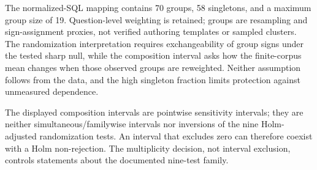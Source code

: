\documentclass[applsci,article,submit,moreauthors]{Definitions/mdpi}
\begin{document}
\begin{table}[htbp]
\caption{Complete primary factorial family for strict execution equality. Estimates are question-weighted finite-set differences; intervals are 95\% normalized-SQL-group composition-sensitivity intervals. Each sign-randomization used 70 groups, 100,000 draws, and the displayed raw values were Holm-adjusted jointly over all nine rows.}
\label{tab:factorial-nine}\centering\scriptsize
{}
\end{table}

The normalized-SQL mapping contains 70 groups, 58 singletons, and a maximum group size of 19. Question-level weighting is retained; groups are resampling and sign-assignment proxies, not verified authoring templates or sampled clusters. The randomization interpretation requires exchangeability of group signs under the tested sharp null, while the composition interval asks how the finite-corpus mean changes when those observed groups are reweighted. Neither assumption follows from the data, and the high singleton fraction limits protection against unmeasured dependence.

The displayed composition intervals are pointwise sensitivity intervals; they are neither simultaneous/familywise intervals nor inversions of the nine Holm-adjusted randomization tests. An interval that excludes zero can therefore coexist with a Holm non-rejection. The multiplicity decision, not interval exclusion, controls statements about the documented nine-test family.
\end{document}
